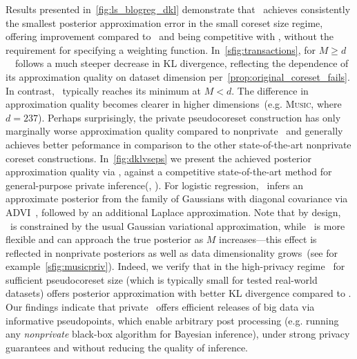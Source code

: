 Results presented in~\cref{fig:ls_blogreg_dkl} demonstrate that \psvi~achieves consistently the smallest posterior approximation error in the small coreset size regime, offering improvement
compared to \sparsevi~and being competitive with \gigao,
without the requirement for specifying a weighting function. In~\cref{sfig:transactions}, for $M \geq d$ ~\gigao~follows a much steeper decrease in KL divergence, reflecting the dependence of its approximation quality on dataset dimension per~\cref{prop:original_coreset_fails}. In contrast, \psvi~typically reaches its minimum at $M<d$. The difference in approximation quality becomes clearer in higher dimensions~(e.g. \textsc{Music}, where $d=237$). Perhaps surprisingly, the private pseudocoreset construction has only marginally worse approximation quality compared to nonprivate \psvi~and generally achieves better peformance in comparison to the other state-of-the-art nonprivate coreset constructions. 
In~\cref{fig:dklvseps} we present the achieved posterior approximation quality via \dpsvi, against a competitive state-of-the-art method for general-purpose private inference(\dpvi, \cite{jalko17}). For logistic regression, \dpvi~infers an approximate posterior from the family of Gaussians with diagonal covariance via ADVI~\citep{kucukelbir17}, followed by an additional Laplace approximation. Note that by design, \dpvi~is constrained by the usual Gaussian variational approximation, while \dpsvi~is more flexible and can approach the true posterior as $ M $ increases---this effect is reflected in nonprivate posteriors as well as data dimensionality grows~(see for example~\cref{sfig:musicpriv}). Indeed, we verify that in the high-privacy regime \dpsvi~for sufficient pseudocoreset size (which is typically small for tested real-world datasets) offers posterior approximation with better KL divergence compared to \dpvi. Our findings indicate that private \psvi~offers efficient releases of big data via informative pseudopoints, which enable arbitrary post processing (e.g. running any \emph{nonprivate} black-box algorithm for Bayesian inference), under strong privacy guarantees and without reducing the quality of inference.







